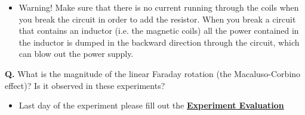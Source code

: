 \documentclass{../lab}
\begin{document}
\begin{enumerate}
    \begin{itemize}
        \item Warning! Make sure that there is no current running through the coils when you break the circuit in order to add the resistor. When you break a circuit that contains an inductor (i.e. the magnetic coils) all the power contained in the inductor is dumped in the backward direction through the circuit, which can blow out the power supply.
    
    \end{itemize}
    
    \textbf{Q.} What is the magnitude of the linear Faraday rotation (the Macaluso-Corbino effect)? Is it observed in these experiments?

\end{enumerate}

\begin{itemize}
    \item Last day of the experiment please fill out the \href{\ExperimentEvaluation}{\textbf{Experiment Evaluation}}

\end{itemize}
\end{document}
